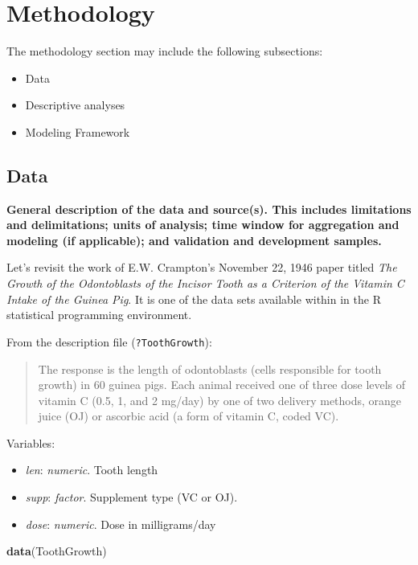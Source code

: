 \documentclass[12pt,oneside]{chicagocapstone}
\newenvironment{Shaded}{\begin{snugshade}}{\end{snugshade}}
\newcommand{\KeywordTok}[1]{\textcolor[rgb]{0.13,0.29,0.53}{\textbf{#1}}}
\newcommand{\NormalTok}[1]{#1}
\providecommand{\tightlist}{%
  \setlength{\itemsep}{0pt}\setlength{\parskip}{0pt}}
\begin{document}
\chapter*{Methodology}\label{methodology}

The methodology section may include the following subsections:
\begin{itemize}
\tightlist
\item
  Data
\item
  Descriptive analyses
\item
  Modeling Framework
\end{itemize}
\section*{Data}\label{methodology-data}

\textbf{General description of the data and source(s). This includes
limitations and delimitations; units of analysis; time window for
aggregation and modeling (if applicable); and validation and development
samples.}

Let's revisit the work of E.W. Crampton's November 22, 1946 paper titled
\emph{The Growth of the Odontoblasts of the Incisor Tooth as a Criterion
of the Vitamin C Intake of the Guinea Pig}. It is one of the data sets
available within in the R statistical programming environment.

From the description file (\texttt{?ToothGrowth}):
\begin{quote}
The response is the length of odontoblasts (cells responsible for tooth
growth) in 60 guinea pigs. Each animal received one of three dose levels
of vitamin C (0.5, 1, and 2 mg/day) by one of two delivery methods,
orange juice (OJ) or ascorbic acid (a form of vitamin C, coded VC).
\end{quote}
Variables:
\begin{itemize}
\tightlist
\item
  \emph{len}: \emph{numeric}. Tooth length
\item
  \emph{supp}: \emph{factor}. Supplement type (VC or OJ).
\item
  \emph{dose}: \emph{numeric}. Dose in milligrams/day
\end{itemize}
\begin{Shaded}
\begin{Highlighting}[]
\KeywordTok{data}\NormalTok{(ToothGrowth)}
\end{Highlighting}
\end{Shaded}
\end{document}
